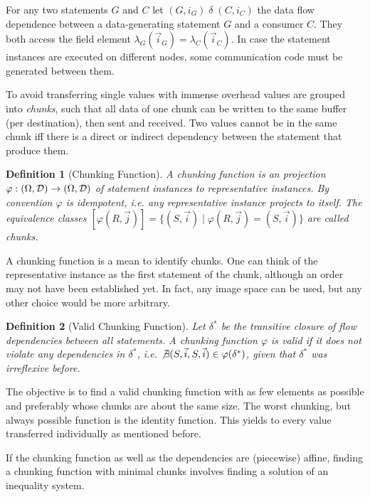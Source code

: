 \documentclass{sigplanconf}
\newtheorem{definition}{Definition}
\newcommand{\Stmt}{\Omega} \newcommand{\Field}{{\cal F}}
\newcommand{\Dom}{{\cal D}}
\begin{document}
For any two statements $G$ and $C$ let $(G,i_G)\; \delta \;(C,i_C)$ the data flow dependence between a data-generating statement $G$ and a consumer $C$. They both access the field element $\lambda_G(\vec i_G) = \lambda_C(\vec i_C)$. In case the statement instances are executed on different nodes, some communication code must be generated between them.

To avoid transferring single values with immense overhead values are grouped into \emph{chunks}, such that all data of one chunk can be written to the same buffer (per destination), then sent and received. Two values cannot be in the same chunk iff there is a direct or indirect dependency between the statement that produce them.

\begin{definition}[Chunking Function]
A \emph{chunking function} is an projection $\varphi: (\Stmt, \Dom) \rightarrow (\Stmt, \Dom)$ of statement instances to representative instances. By convention $\varphi$ is idempotent, i.e. any representative instance projects to itself. The equivalence classes $[\varphi(R, \vec j)] = \{ (S, \vec i) \mid \varphi(R, \vec j) = (S, \vec i) \}$ are called \emph{chunks}.
\end{definition}

A chunking function is a mean to identify chunks. One can think of the representative instance as the first statement of the chunk, although an order may not have been established yet. In fact, any image space can be used, but any other choice would be more arbitrary.


\begin{definition}[Valid Chunking Function]
Let $\delta^*$ be the transitive closure of flow dependencies between all statements. A chunking function $\varphi$ is \emph{valid} if it does not violate any dependencies in $\delta^*$, i.e. $\not\exists (S,\vec i,S,\vec i) \in \varphi(\delta^*)$, given that $\delta^*$ was irreflexive before.
\end{definition}

The objective is to find a valid chunking function with as few elements as possible and preferably whose chunks are about the same size. The worst chunking, but always possible function is the identity function. This yields to every value transferred individually as mentioned before.

If the chunking function as well as the dependencies are (piecewise) affine, finding a chunking function with minimal chunks involves finding a solution of an inequality system.
\end{document}
